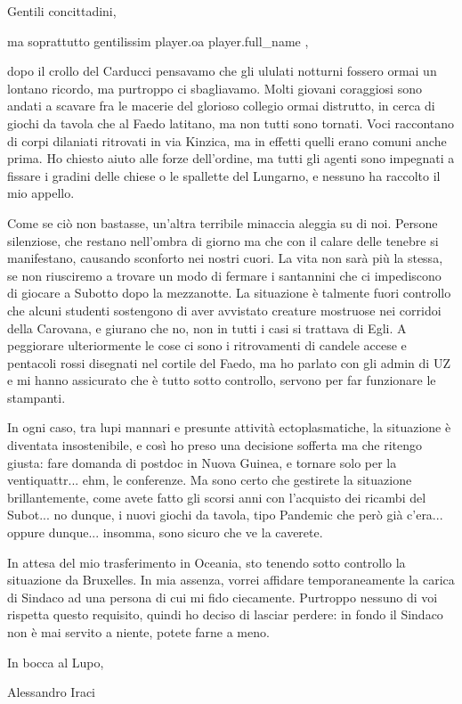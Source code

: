 \documentclass{letter}
\date{26 novembre 2018}
\begin{document}
\begin{letter}{}
\opening{Gentili concittadini,}

ma soprattutto gentilissim{{ player.oa }} {{ player.full_name }},

dopo il crollo del Carducci pensavamo che gli ululati notturni fossero ormai un lontano ricordo, ma purtroppo ci sbagliavamo. Molti giovani coraggiosi sono andati a scavare fra le macerie del glorioso collegio ormai distrutto, in cerca di giochi da tavola che al Faedo latitano, ma non tutti sono tornati. Voci raccontano di corpi dilaniati ritrovati in via Kinzica, ma in effetti quelli erano comuni anche prima. Ho chiesto aiuto alle forze dell'ordine, ma tutti gli agenti sono impegnati a fissare i gradini delle chiese o le spallette del Lungarno, e nessuno ha raccolto il mio appello.

Come se ciò non bastasse, un'altra terribile minaccia aleggia su di noi. Persone silenziose, che restano nell'ombra di giorno ma che con il calare delle tenebre si manifestano, causando sconforto nei nostri cuori. La vita non sarà più la stessa, se non riusciremo a trovare un modo di fermare i santannini che ci impediscono di giocare a Subotto dopo la mezzanotte. La situazione è talmente fuori controllo che alcuni studenti sostengono di aver avvistato creature mostruose nei corridoi della Carovana, e giurano che no, non in tutti i casi si trattava di Egli. A peggiorare ulteriormente le cose ci sono i ritrovamenti di candele accese e pentacoli rossi disegnati nel cortile del Faedo, ma ho parlato con gli admin di UZ e mi hanno assicurato che è tutto sotto controllo, servono per far funzionare le stampanti.

In ogni caso, tra lupi mannari e presunte attività ectoplasmatiche, la situazione è diventata insostenibile, e così ho preso una decisione sofferta ma che ritengo giusta: fare domanda di postdoc in Nuova Guinea, e tornare solo per la ventiquattr... ehm, le conferenze. Ma sono certo che gestirete la situazione brillantemente, come avete fatto gli scorsi anni con l'acquisto dei ricambi del Subot... no dunque, i nuovi giochi da tavola, tipo Pandemic che però già c'era... oppure dunque... insomma, sono sicuro che ve la caverete.

In attesa del mio trasferimento in Oceania, sto tenendo sotto controllo la situazione da Bruxelles. In mia assenza, vorrei affidare temporaneamente la carica di Sindaco ad una persona di cui mi fido ciecamente. Purtroppo nessuno di voi rispetta questo requisito, quindi ho deciso di lasciar perdere: in fondo il Sindaco non è mai servito a niente, potete farne a meno.

In bocca al Lupo,

\bigskip

\noindent Alessandro Iraci

\end{letter}
\end{document}
